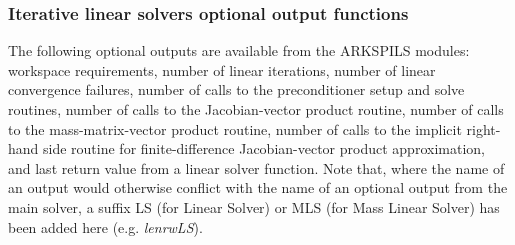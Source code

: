 \documentclass[letterpaper,10pt,english]{sphinxmanual}
\begin{document}
\subsubsection{Iterative linear solvers optional output functions}
\label{c_interface/User_callable:iterative-linear-solvers-optional-output-functions}\label{c_interface/User_callable:cinterface-arkspilsoutputs}
The following optional outputs are available from the ARKSPILS
modules: workspace requirements, number of linear iterations, number
of linear convergence failures, number of calls to the preconditioner
setup and solve routines, number of calls to the Jacobian-vector
product routine, number of calls to the mass-matrix-vector
product routine, number of calls to the implicit right-hand side
routine for finite-difference Jacobian-vector product approximation,
and last return value from a linear solver function.  Note that, where
the name of an output would otherwise conflict with the name of an
optional output from the main solver, a suffix LS (for Linear Solver)
or MLS (for Mass Linear Solver) has been added here (e.g. \emph{lenrwLS}).
\end{document}
